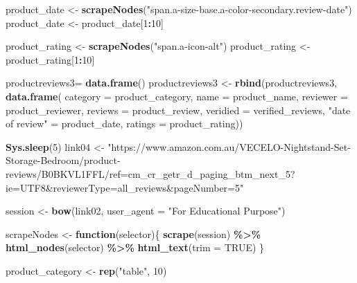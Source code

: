 \documentclass[
]{article}
\newenvironment{Shaded}{\begin{snugshade}}{\end{snugshade}}
\newcommand{\AttributeTok}[1]{\textcolor[rgb]{0.13,0.29,0.53}{#1}}
\newcommand{\ConstantTok}[1]{\textcolor[rgb]{0.56,0.35,0.01}{#1}}
\newcommand{\ControlFlowTok}[1]{\textcolor[rgb]{0.13,0.29,0.53}{\textbf{#1}}}
\newcommand{\DecValTok}[1]{\textcolor[rgb]{0.00,0.00,0.81}{#1}}
\newcommand{\FunctionTok}[1]{\textcolor[rgb]{0.13,0.29,0.53}{\textbf{#1}}}
\newcommand{\NormalTok}[1]{#1}
\newcommand{\OtherTok}[1]{\textcolor[rgb]{0.56,0.35,0.01}{#1}}
\newcommand{\SpecialCharTok}[1]{\textcolor[rgb]{0.81,0.36,0.00}{\textbf{#1}}}
\newcommand{\StringTok}[1]{\textcolor[rgb]{0.31,0.60,0.02}{#1}}
\begin{document}
\begin{Shaded}
\begin{Highlighting}[]
\NormalTok{  product\_date }\OtherTok{\textless{}{-}} \FunctionTok{scrapeNodes}\NormalTok{(}\StringTok{"span.a{-}size{-}base.a{-}color{-}secondary.review{-}date"}\NormalTok{)}
\NormalTok{  product\_date }\OtherTok{\textless{}{-}}\NormalTok{ product\_date[}\DecValTok{1}\SpecialCharTok{:}\DecValTok{10}\NormalTok{]}
  
\NormalTok{  product\_rating }\OtherTok{\textless{}{-}} \FunctionTok{scrapeNodes}\NormalTok{(}\StringTok{"span.a{-}icon{-}alt"}\NormalTok{)}
\NormalTok{  product\_rating }\OtherTok{\textless{}{-}}\NormalTok{ product\_rating[}\DecValTok{1}\SpecialCharTok{:}\DecValTok{10}\NormalTok{]}
  
\NormalTok{  productreviews3}\OtherTok{=} \FunctionTok{data.frame}\NormalTok{()}
\NormalTok{  productreviews3 }\OtherTok{\textless{}{-}} \FunctionTok{rbind}\NormalTok{(productreviews3, }\FunctionTok{data.frame}\NormalTok{(}
                      \AttributeTok{category =}\NormalTok{ product\_category,}
                      \AttributeTok{name =}\NormalTok{ product\_name,}
                      \AttributeTok{reviewer =}\NormalTok{ product\_reviewer,}
                      \AttributeTok{reviews =}\NormalTok{ product\_review,}
                      \AttributeTok{veridied =}\NormalTok{ verified\_reviews,}
                      \StringTok{"date of review"} \OtherTok{=}\NormalTok{ product\_date,}
                      \AttributeTok{ratings =}\NormalTok{ product\_rating))}
  
   \FunctionTok{Sys.sleep}\NormalTok{(}\DecValTok{5}\NormalTok{)}
\NormalTok{link04 }\OtherTok{\textless{}{-}} \StringTok{"https://www.amazon.com.au/VECELO{-}Nightstand{-}Set{-}Storage{-}Bedroom/product{-}reviews/B0BKVL1FFL/ref=cm\_cr\_getr\_d\_paging\_btm\_next\_5?ie=UTF8\&reviewerType=all\_reviews\&pageNumber=5"}


\NormalTok{  session }\OtherTok{\textless{}{-}} \FunctionTok{bow}\NormalTok{(link02,}
               \AttributeTok{user\_agent =} \StringTok{"For Educational Purpose"}\NormalTok{)}

\NormalTok{  scrapeNodes }\OtherTok{\textless{}{-}} \ControlFlowTok{function}\NormalTok{(selector)\{}
    \FunctionTok{scrape}\NormalTok{(session) }\SpecialCharTok{\%\textgreater{}\%}
      \FunctionTok{html\_nodes}\NormalTok{(selector) }\SpecialCharTok{\%\textgreater{}\%}
      \FunctionTok{html\_text}\NormalTok{(}\AttributeTok{trim =} \ConstantTok{TRUE}\NormalTok{)}
\NormalTok{  \}}

\NormalTok{  product\_category }\OtherTok{\textless{}{-}} \FunctionTok{rep}\NormalTok{(}\StringTok{"table"}\NormalTok{, }\DecValTok{10}\NormalTok{)}


\end{Highlighting}
\end{Shaded}
\end{document}
